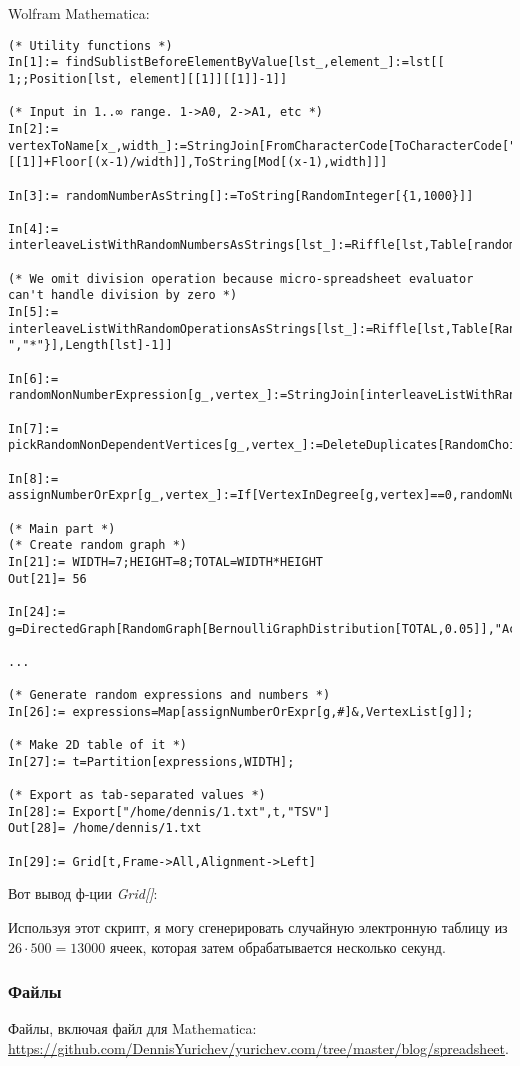 Wolfram Mathematica:

\begin{lstlisting}
(* Utility functions *)
In[1]:= findSublistBeforeElementByValue[lst_,element_]:=lst[[ 1;;Position[lst, element][[1]][[1]]-1]]

(* Input in 1..∞ range. 1->A0, 2->A1, etc *)
In[2]:= vertexToName[x_,width_]:=StringJoin[FromCharacterCode[ToCharacterCode["A"][[1]]+Floor[(x-1)/width]],ToString[Mod[(x-1),width]]]

In[3]:= randomNumberAsString[]:=ToString[RandomInteger[{1,1000}]]

In[4]:= interleaveListWithRandomNumbersAsStrings[lst_]:=Riffle[lst,Table[randomNumberAsString[],Length[lst]-1]]

(* We omit division operation because micro-spreadsheet evaluator can't handle division by zero *)
In[5]:= interleaveListWithRandomOperationsAsStrings[lst_]:=Riffle[lst,Table[RandomChoice[{"+","-","*"}],Length[lst]-1]]

In[6]:= randomNonNumberExpression[g_,vertex_]:=StringJoin[interleaveListWithRandomOperationsAsStrings[interleaveListWithRandomNumbersAsStrings[Map[vertexToName[#,WIDTH]&,pickRandomNonDependentVertices[g,vertex]]]]]

In[7]:= pickRandomNonDependentVertices[g_,vertex_]:=DeleteDuplicates[RandomChoice[findSublistBeforeElementByValue[TopologicalSort[g],vertex],RandomInteger[{1,5}]]]

In[8]:= assignNumberOrExpr[g_,vertex_]:=If[VertexInDegree[g,vertex]==0,randomNumberAsString[],randomNonNumberExpression[g,vertex]]

(* Main part *) 
(* Create random graph *)
In[21]:= WIDTH=7;HEIGHT=8;TOTAL=WIDTH*HEIGHT
Out[21]= 56

In[24]:= g=DirectedGraph[RandomGraph[BernoulliGraphDistribution[TOTAL,0.05]],"Acyclic"];

...

(* Generate random expressions and numbers *)
In[26]:= expressions=Map[assignNumberOrExpr[g,#]&,VertexList[g]];

(* Make 2D table of it *)
In[27]:= t=Partition[expressions,WIDTH];

(* Export as tab-separated values *)
In[28]:= Export["/home/dennis/1.txt",t,"TSV"]
Out[28]= /home/dennis/1.txt

In[29]:= Grid[t,Frame->All,Alignment->Left]
\end{lstlisting}

Вот вывод ф-ции \textit{Grid[]}:



Используя этот скрипт, я могу сгенерировать случайную электронную таблицу из $26 \cdot 500=13000$ ячеек,
которая затем обрабатывается несколько секунд.

\subsubsection{Файлы}

Файлы, включая файл для Mathematica: \url{https://github.com/DennisYurichev/yurichev.com/tree/master/blog/spreadsheet}.


